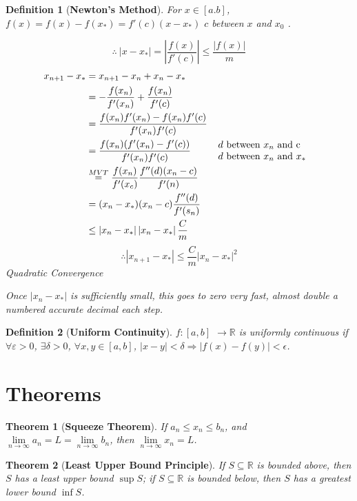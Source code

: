 \documentclass[12pt]{article}
\newcommand{\abs}[1]{\left| #1 \right|}
\theoremstyle{plain}
\newtheorem{theorem}{Theorem}[section]
\newtheorem{definition}{Definition}[section]
\newcommand{\ep}{\varepsilon}
\newcommand{\dlim}{\displaystyle\lim\limits}
\begin{document}
\begin{definition}[\textbf{Newton's Method}]
	For $x \in [a.b]$, $f(x) = f(x) - f(x_*) = f'(c)(x-x_*)$ 
	$c$ between $x$ and $x_0$ . 

	\[
		\therefore \ \abs{x-x_*} =\abs{ \frac{f(x)}{f'(c)}} \leq \frac{\abs{f(x)}}m
	\]
	\begin{align*}
		x_{n+1}-x_* 
		&= x_{n+1}-x_n + x_n -x_*\\
		&= -\frac{f(x_n)}{f'(x_n)}+\frac{f(x_n)}{f'(c)}\\
		&= \frac{f(x_n)f'(x_n)-f(x_n)f'(c)}{f'(x_n)f'(c)}\\
		&= \frac{f(x_n)(f'(x_n)-f'(c))}{f'(x_n) f'(c)} 
		\tag*{
		$
		\begin{array}{l}
		 	\text{$d$ between $x_n$ and c} \\ 
		 	\text{$d$ between $x_n$ and $x_*$}
		\end{array}
		$
	  }\\ 
		&\overset{MVT}{=} \frac{f(x_n)}{f'(x_c)}\frac{f''(d)(x_n-c)}{f'(n)}
		\\
		&= (x_n-x_*)(x_n-c)\frac{f''(d)}{f'(s_n)} \\
		&\leq \abs{x_n-x_*}\abs{x_n-x_*} \frac Cm
	\end{align*}
	\[
		\therefore \abs{x_{n+1}-x_*} \leq \frac Cm \abs{x_n-x_*}^2
	\]
	Quadratic Convergence
	
	Once $\abs{x_n-x_*}$ is sufficiently small, this goes to zero very fast,
	almost double a numbered accurate decimal each step.\\
	\end{definition}

	\begin{definition}[\textbf{Uniform Continuity}]
		$f: [a,b]$ $\to \mathbb{R}$ is uniformly continuous if $\forall \ep > 0$,
		$\exists \delta > 0$, $\forall x, y \in [a, b]$, $\abs{x-y}<\delta\Rightarrow
		\abs{f(x)-f(y)} < \epsilon$. \\
	\end{definition}


	\section{Theorems}
	\begin{theorem}[\textbf{Squeeze Theorem}]
        If $a_n \leq x_n \leq b_n$, and 
        $\dlim_{n\to\infty} a_n= L = \dlim_{n\to\infty} b_n$, 
        then $\dlim_{n\to\infty} x_n = L$. \\
  \end{theorem}

	\begin{theorem}[\textbf{Least Upper Bound Principle}]
		If $S \subseteq \mathbb{R}$ is bounded above, then $S$ has a least 
		upper bound $\sup S$; if $S \subseteq \mathbb{R}$ is bounded below,
		then $S$ has a greatest lower bound $\inf S$.\\
	\end{theorem}
	
\end{document}
